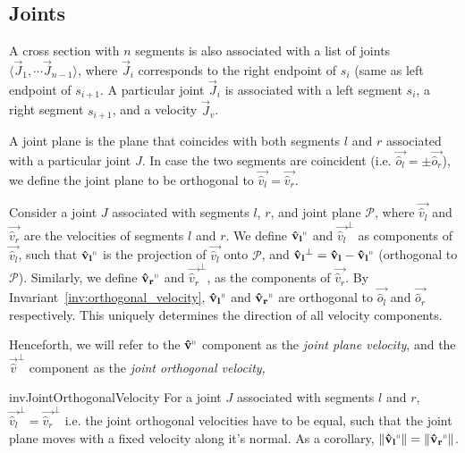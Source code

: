\subsection{Joints}
\label{sec:joints}

\begin{definition}
\label{def:joints}
A cross section with $n$ segments is also associated with a list of joints
$ \langle \vec J_1,\cdots \vec J_{n-1} \rangle$,
where $\vec J_i$ corresponds to the right endpoint of $s_i$ (same as left endpoint of $s_{i+1}$.
A particular joint $\vec J_i$ is associated with a left segment $s_i$,
a right segment $s_{i+1}$, and a velocity $\vec J_v$.
\end{definition}

\begin{definition}
\label{def:joint_plane}
A joint plane is the plane that coincides with both segments $l$ and $r$ associated with a particular joint $J$.
In case the two segments are coincident (i.e. $\vec{\hat o_l} = \pm \vec{\hat o_r}$),
we define the joint plane to be orthogonal to $\vec{\hat v_l} = \vec{\hat v_r}$.
\end{definition}

\begin{definition}
\label{def:joint_plane_velocity}
Consider a joint $J$ associated with segments $l$, $r$, and joint plane $\mathcal P$,
where $\vec{\hat v_l}$ and $\vec{\hat v_r}$ are the velocities of segments $l$ and $r$.
We define $\vec{\hat v_l}^\shortparallel$ and $\vec{\hat v_l}^\perp$ as components of
$\vec{\hat v_l}$, such that $\vec{\hat v_l}^\shortparallel$ is the projection of $\vec{\hat v_l}$
onto $\mathcal P$, and $\vec{\hat v_l}^\perp = \vec{\hat v_l} - \vec{\hat v_l}^\shortparallel$
(orthogonal to $\mathcal P$).
Similarly, we define $\vec{\hat v_r}^\shortparallel$ and $\vec{\hat v_r}^\perp$, as the components of $\vec{\hat v_r}$.
By Invariant~\ref{inv:orthogonal_velocity}, $\vec{\hat v_l}^\shortparallel$ and $\vec{\hat v_r}^\shortparallel$
are orthogonal to $\vec{\hat o_l}$ and $\vec{\hat o_r}$ respectively.
This uniquely determines the direction of all velocity components.
\end{definition}

Henceforth, we will refer to the $\vec{\hat v}^\shortparallel$ component as the \emph{joint plane velocity},
and the $\vec{\hat v}^\perp$ component as the \emph{joint orthogonal velocity,}

\begin{restatable}{inv}{JointOrthogonalVelocity}
\label{inv:joint_orthogonal_velocity}
For a joint $J$ associated with segments $l$ and $r$, $\vec{\hat v_l}^\perp = \vec{\hat v_r}^\perp$
i.e. the joint orthogonal velocities have to be equal, such that the joint plane moves with a fixed velocity along it's normal.
As a corollary, $ \left\| \vec{\hat v_l}^\shortparallel\right\| = \left\| \vec{\hat v_r}^\shortparallel\right\|$.
\end{restatable}

